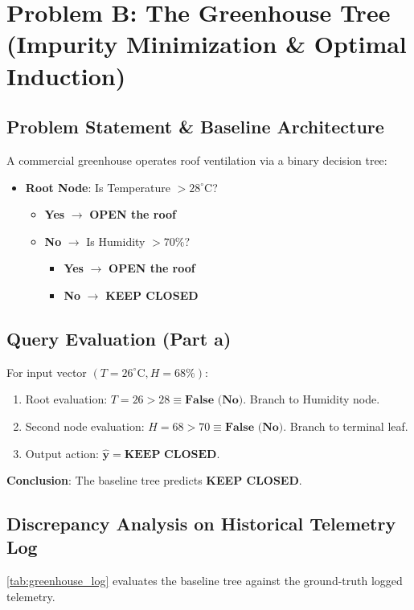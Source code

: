 \documentclass[11pt,a4paper]{article}
\theoremstyle{definition}
\theoremstyle{plain}
\theoremstyle{remark}
\begin{document}
\section{Problem B: The Greenhouse Tree (Impurity Minimization \& Optimal Induction)}

\subsection{Problem Statement \& Baseline Architecture}
A commercial greenhouse operates roof ventilation via a binary decision tree:
\begin{itemize}[noitemsep]
    \item \textbf{Root Node}: Is Temperature $> 28^\circ\text{C}$?
    \begin{itemize}[noitemsep]
        \item \textbf{Yes} $\to$ \textbf{OPEN the roof}
        \item \textbf{No} $\to$ Is Humidity $> 70\%$?
        \begin{itemize}[noitemsep]
            \item \textbf{Yes} $\to$ \textbf{OPEN the roof}
            \item \textbf{No} $\to$ \textbf{KEEP CLOSED}
        \end{itemize}
    \end{itemize}
\end{itemize}

\subsection{Query Evaluation (Part a)}
For input vector $(T = 26^\circ\text{C}, H = 68\%)$:
\begin{enumerate}[noitemsep]
    \item Root evaluation: $T = 26 > 28 \equiv \textbf{False (No)}$. Branch to Humidity node.
    \item Second node evaluation: $H = 68 > 70 \equiv \textbf{False (No)}$. Branch to terminal leaf.
    \item Output action: $\mathbf{\hat{y} = \text{KEEP CLOSED}}$.
\end{enumerate}
\textbf{Conclusion}: The baseline tree predicts \textbf{KEEP CLOSED}.

\subsection{Discrepancy Analysis on Historical Telemetry Log}
\cref{tab:greenhouse_log} evaluates the baseline tree against the ground-truth logged telemetry.
\end{document}
